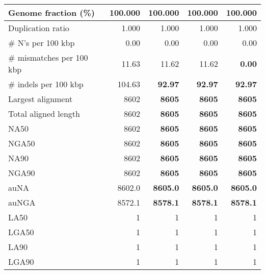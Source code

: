 \documentclass[12pt,a4paper]{article}
\begin{document}
\begin{table}[ht]
\begin{center}
\begin{tabular}{|l*{4}{|r}|}
Genome fraction (\%) & 100.000 & 100.000 & 100.000 & 100.000 \\ \hline
Duplication ratio & 1.000 & 1.000 & 1.000 & 1.000 \\ \hline
\# N's per 100 kbp & 0.00 & 0.00 & 0.00 & 0.00 \\ \hline
\# mismatches per 100 kbp & 11.63 & 11.62 & 11.62 & {\bf 0.00} \\ \hline
\# indels per 100 kbp & 104.63 & {\bf 92.97} & {\bf 92.97} & {\bf 92.97} \\ \hline
Largest alignment & 8602 & {\bf 8605} & {\bf 8605} & {\bf 8605} \\ \hline
Total aligned length & 8602 & {\bf 8605} & {\bf 8605} & {\bf 8605} \\ \hline
NA50 & 8602 & {\bf 8605} & {\bf 8605} & {\bf 8605} \\ \hline
NGA50 & 8602 & {\bf 8605} & {\bf 8605} & {\bf 8605} \\ \hline
NA90 & 8602 & {\bf 8605} & {\bf 8605} & {\bf 8605} \\ \hline
NGA90 & 8602 & {\bf 8605} & {\bf 8605} & {\bf 8605} \\ \hline
auNA & 8602.0 & {\bf 8605.0} & {\bf 8605.0} & {\bf 8605.0} \\ \hline
auNGA & 8572.1 & {\bf 8578.1} & {\bf 8578.1} & {\bf 8578.1} \\ \hline
LA50 & 1 & 1 & 1 & 1 \\ \hline
LGA50 & 1 & 1 & 1 & 1 \\ \hline
LA90 & 1 & 1 & 1 & 1 \\ \hline
LGA90 & 1 & 1 & 1 & 1 \\ \hline
\end{tabular}
\end{center}
\end{table}
\end{document}
